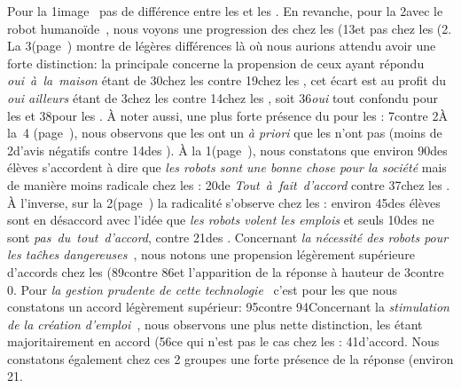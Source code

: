             Pour la 1\iere image~ pas de différence entre les  et les . 
            En revanche, pour la 2\nde avec le robot humanoïde~, nous voyons une progression des  chez les  (13\prc[)] et pas chez les  (2\prc[)].
            La 3\ieme {}({\footnotesize page~\pageref{QA3}}) montre de légères différences là où nous aurions attendu avoir une forte distinction:
            la principale concerne la propension de ceux ayant répondu \textit{oui~à~la~maison} étant de 30\prc chez les  contre 19\prc chez les , cet écart est au profit du \textit{oui ailleurs} étant de 3\prc chez les  contre 14\prc chez les , soit 36\prc \textit{oui} tout confondu pour les  et 38\prc pour les .
            À noter aussi, une plus forte présence du  pour les : 7\prc contre 2\prc[.]
            À la~4 ({\footnotesize page~\pageref{QA4}}), nous observons que les  ont un \textit{à priori} que les  n'ont pas (moins de 2\prc d'avis négatifs contre 14\prc des ).
            À la 1\iere {}({\footnotesize page~\pageref{QA5-1}}), nous constatons que environ 90\prc des élèves s'accordent à dire que \textit{les robots sont une bonne chose pour la société} mais de manière moins radicale chez les : 20\prc de \textit{Tout~à~fait~d'accord} contre 37\prc chez les .
            À l'inverse, sur la 2\ieme {}({\footnotesize page~\pageref{QA5-2}}) la radicalité s'observe chez les : environ 45\prc des élèves sont en désaccord avec l'idée que \textit{les robots volent les emplois} et seuls 10\prc des  ne sont \textit{pas~du~tout~d'accord}, contre 21\prc des .
            Concernant \textit{la nécessité des robots pour les taĉhes dangereuses}~, nous notons une propension légèrement supérieure d'accords chez les  (89\prc contre 86\prc[)] et l'apparition de la réponse  à hauteur de 3\prc contre 0\prc[)].
            Pour \textit{la gestion prudente de cette technologie}~ c'est pour les  que nous constatons un accord légèrement supérieur: 95\prc contre 94\prc[.]
            Concernant la \textit{stimulation de la création d'emploi}~, nous observons une plus nette distinction, les  étant majoritairement en accord (56\prc[)] ce qui n'est pas le cas chez les : 41\prc d'accord. Nous constatons également chez ces 2 groupes une forte présence de la réponse  (environ 21\prc[)].
